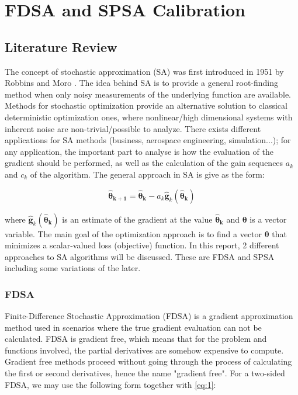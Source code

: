 
\chapter{FDSA and SPSA Calibration}\label{chapter:fdsa_and_spsa_calibration}
\section{Literature Review}
The concept of stochastic approximation (SA) was first introduced in 1951 by Robbins and Moro \parencite{spall:2012}. The idea behind SA is to provide a general root-finding method when only noisy measurements of the underlying function are available. Methods for stochastic optimization provide an alternative solution to classical deterministic optimization ones, where nonlinear/high dimensional systems with inherent noise are non-trivial/possible to analyze. There exists different applications for SA methods (business, aerospace engineering, simulation...); for any application, the important part to analyse is how the evaluation of the gradient should be performed, as well as the calculation of the gain sequences \(a_k\) and \(c_k\) of the algorithm. The general approach in SA is give as the form:

\begin{equation}
\boldsymbol{\hat{\theta}_{k+1}} = \boldsymbol{\hat{\theta}_k} - a_k\boldsymbol{\hat{g}}_k(\boldsymbol{\hat{\theta}_k})
\label{eq:1}
\end{equation}

where \(\boldsymbol{\hat{g}}_k(\boldsymbol{\hat{\theta}_k})\) is an estimate of the gradient at the value \(\boldsymbol{\hat{\theta}_k}\) and \(\boldsymbol{\theta}\) is a vector variable. The main goal of the optimization approach is to find a vector \(\boldsymbol{\theta}\) that minimizes a scalar-valued loss (objective) function. In this report, 2 different approaches to SA algorithms will be discussed. These are FDSA and SPSA including some variations of the later. 

\subsection{FDSA}
Finite-Difference Stochastic Approximation (FDSA) is a gradient approximation method used in scenarios where the true gradient evaluation can not be calculated. FDSA is gradient free, which means that for the problem and functions involved, the partial derivatives are somehow expensive to compute. Gradient free methods proceed without going through the process of calculating the first or second derivatives, hence the name "gradient free". For a two-sided FDSA, we may use the following form together with \ref{eq:1}:

